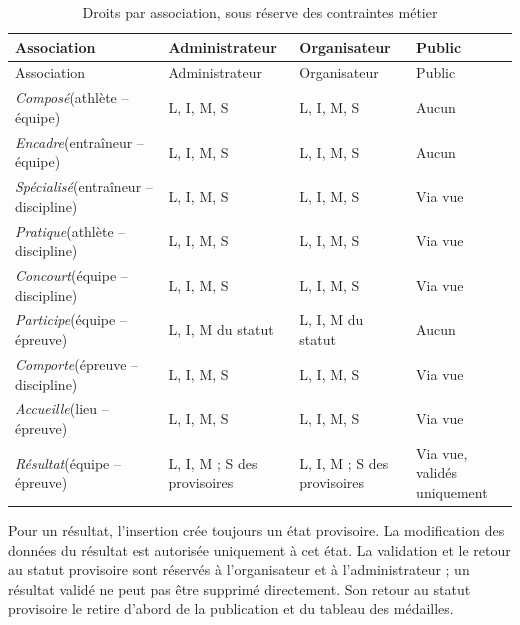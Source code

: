 {\footnotesize
\renewcommand{\arraystretch}{1.3}
\begin{longtable}{|>{\raggedright\arraybackslash}p{3.1cm}|
                  >{\centering\arraybackslash}p{3.0cm}|
                  >{\centering\arraybackslash}p{4.4cm}|
                  >{\centering\arraybackslash}p{3.0cm}|}
  \caption{Droits par association, sous réserve des contraintes métier}
  \label{tab:droits-associations} \\
  \hline
  \rowcolor{gray!25}
  {Association} & {Administrateur} & {Organisateur} & {Public} \\
  \hline
  \endfirsthead
  \hline
  \rowcolor{gray!25}
  {Association} & {Administrateur} & {Organisateur} & {Public} \\
  \hline
  \endhead
  \hline
  \endfoot
  \emph{Composé}\newline (athlète -- équipe) & L, I, M, S & L, I, M, S & Aucun \\
  \hline
  \emph{Encadre}\newline (entraîneur -- équipe) & L, I, M, S & L, I, M, S & Aucun \\
  \hline
  \emph{Spécialisé}\newline (entraîneur -- discipline) & L, I, M, S & L, I, M, S & Via vue \\
  \hline
  \emph{Pratique}\newline (athlète -- discipline) & L, I, M, S & L, I, M, S & Via vue \\
  \hline
  \emph{Concourt}\newline (équipe -- discipline) & L, I, M, S & L, I, M, S & Via vue \\
  \hline
  \emph{Participe}\newline (équipe -- épreuve) & L, I, M du statut & L, I, M du statut & Aucun \\
  \hline
  \emph{Comporte}\newline (épreuve -- discipline) & L, I, M, S & L, I, M, S & Via vue \\
  \hline
  \emph{Accueille}\newline (lieu -- épreuve) & L, I, M, S & L, I, M, S & Via vue \\
  \hline
  \emph{Résultat}\newline (équipe -- épreuve) & L, I, M ; S des provisoires & L, I, M ; S des provisoires & Via vue, validés uniquement \\
  \hline
\end{longtable}
}

Pour un résultat, l'insertion crée toujours un état provisoire. La modification des données du résultat est autorisée uniquement à cet état. La validation et le retour au statut provisoire sont réservés à l'organisateur et à l'administrateur ; un résultat validé ne peut pas être supprimé directement. Son retour au statut provisoire le retire d'abord de la publication et du tableau des médailles.

